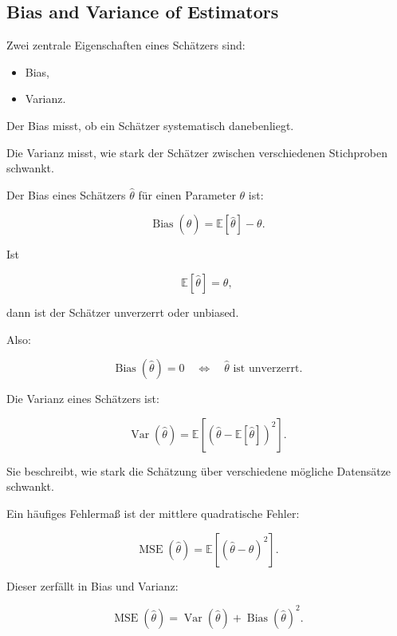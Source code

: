 \documentclass[11pt,a4paper]{scrartcl}
\begin{document}
\subsection{Bias and Variance of Estimators}

\begin{notebox}
    Zwei zentrale Eigenschaften eines Schätzers sind:

    \begin{itemize}
        \item Bias,
        \item Varianz.
    \end{itemize}

    Der Bias misst, ob ein Schätzer systematisch danebenliegt.

    Die Varianz misst, wie stark der Schätzer zwischen verschiedenen Stichproben
    schwankt.
\end{notebox}

\begin{calculationbox}
    Der Bias eines Schätzers \(\hat\theta\) für einen Parameter \(\theta\) ist:

    \[
        \operatorname{Bias}(\hat\theta)
        =
        \mathbb{E}[\hat\theta] - \theta.
    \]

    Ist

    \[
        \mathbb{E}[\hat\theta] = \theta,
    \]

    dann ist der Schätzer unverzerrt oder unbiased.

    Also:

    \[
        \boxed{
            \operatorname{Bias}(\hat\theta)=0
            \quad \Longleftrightarrow \quad
            \hat\theta \text{ ist unverzerrt.}
        }
    \]
\end{calculationbox}

\begin{calculationbox}
    Die Varianz eines Schätzers ist:

    \[
        \operatorname{Var}(\hat\theta)
        =
        \mathbb{E}\left[
            \left(\hat\theta-\mathbb{E}[\hat\theta]\right)^2
        \right].
    \]

    Sie beschreibt, wie stark die Schätzung über verschiedene mögliche
    Datensätze schwankt.
\end{calculationbox}

\begin{calculationbox}
    Ein häufiges Fehlermaß ist der mittlere quadratische Fehler:

    \[
        \operatorname{MSE}(\hat\theta)
        =
        \mathbb{E}\left[
            \left(\hat\theta-\theta\right)^2
        \right].
    \]

    Dieser zerfällt in Bias und Varianz:

    \[
        \operatorname{MSE}(\hat\theta)
        =
        \operatorname{Var}(\hat\theta)
        +
        \operatorname{Bias}(\hat\theta)^2.
    \]
\end{calculationbox}
\end{document}
